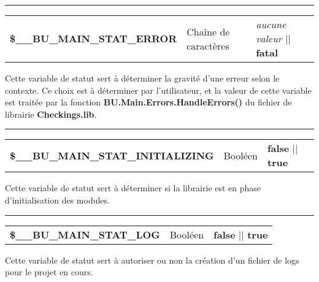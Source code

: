 \documentclass[a4paper,10pt]{article}
\begin{document}
\par\noindent\rule{\textwidth}{0.4pt}

\begin{justify}
    \begin{tabular}{l|l|l}
                \textbf{\color{vars}\$\_\_BU\_MAIN\_STAT\_ERROR}  & Chaîne de caractères    & \textit{aucune valeur} || \textbf{fatal}\\[1\baselineskip]
    \end{tabular}
\end{justify}

\begin{justify}
    Cette variable de statut sert à déterminer la gravité d'une erreur selon le contexte. Ce choix est à déterminer par l'utilisateur, et la valeur de cette variable est traitée par la fonction \textbf{\color{func}BU.Main.Errors.HandleErrors()} du fichier de librairie \textbf{\color{path}Checkings.lib}.
\end{justify}


\par\noindent\rule{\textwidth}{0.4pt}

\begin{justify}
    \begin{tabular}{l|l|l}
        \textbf{\color{vars}\$\_\_BU\_MAIN\_STAT\_INITIALIZING}       & Booléen  & \textbf{false} || \textbf{true}\\[1\baselineskip]
    \end{tabular}
\end{justify}

\begin{justify}
    Cette variable de statut sert à déterminer si la librairie est en phase d'initialisation des modules.
\end{justify}


\par\noindent\rule{\textwidth}{0.4pt}

\begin{justify}
    \begin{tabular}{l|l|l}
        \textbf{\color{vars}\$\_\_BU\_MAIN\_STAT\_LOG}    & Booléen      & \textbf{false} || \textbf{true}\\[1\baselineskip]
    \end{tabular}
\end{justify}

\begin{justify}
    Cette variable de statut sert à autoriser ou non la création d'un fichier de logs pour le projet en cours.
\end{justify}
\end{document}
